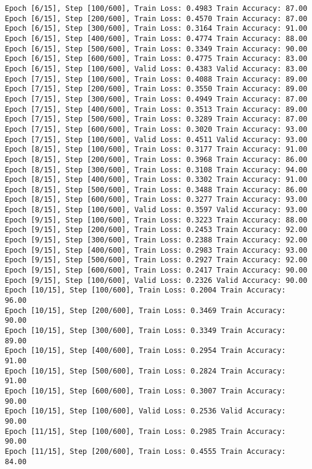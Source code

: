 \documentclass[11pt]{article}
\begin{document}
\begin{Verbatim}[commandchars=\\\{\}]
Epoch [6/15], Step [100/600], Train Loss: 0.4983 Train Accuracy: 87.00
Epoch [6/15], Step [200/600], Train Loss: 0.4570 Train Accuracy: 87.00
Epoch [6/15], Step [300/600], Train Loss: 0.3164 Train Accuracy: 91.00
Epoch [6/15], Step [400/600], Train Loss: 0.4774 Train Accuracy: 88.00
Epoch [6/15], Step [500/600], Train Loss: 0.3349 Train Accuracy: 90.00
Epoch [6/15], Step [600/600], Train Loss: 0.4775 Train Accuracy: 83.00
Epoch [6/15], Step [100/600], Valid Loss: 0.4383 Valid Accuracy: 83.00
Epoch [7/15], Step [100/600], Train Loss: 0.4088 Train Accuracy: 89.00
Epoch [7/15], Step [200/600], Train Loss: 0.3550 Train Accuracy: 89.00
Epoch [7/15], Step [300/600], Train Loss: 0.4949 Train Accuracy: 87.00
Epoch [7/15], Step [400/600], Train Loss: 0.3513 Train Accuracy: 89.00
Epoch [7/15], Step [500/600], Train Loss: 0.3289 Train Accuracy: 87.00
Epoch [7/15], Step [600/600], Train Loss: 0.3020 Train Accuracy: 93.00
Epoch [7/15], Step [100/600], Valid Loss: 0.4511 Valid Accuracy: 93.00
Epoch [8/15], Step [100/600], Train Loss: 0.3177 Train Accuracy: 91.00
Epoch [8/15], Step [200/600], Train Loss: 0.3968 Train Accuracy: 86.00
Epoch [8/15], Step [300/600], Train Loss: 0.3108 Train Accuracy: 94.00
Epoch [8/15], Step [400/600], Train Loss: 0.3302 Train Accuracy: 91.00
Epoch [8/15], Step [500/600], Train Loss: 0.3488 Train Accuracy: 86.00
Epoch [8/15], Step [600/600], Train Loss: 0.3277 Train Accuracy: 93.00
Epoch [8/15], Step [100/600], Valid Loss: 0.3597 Valid Accuracy: 93.00
Epoch [9/15], Step [100/600], Train Loss: 0.3223 Train Accuracy: 88.00
Epoch [9/15], Step [200/600], Train Loss: 0.2453 Train Accuracy: 92.00
Epoch [9/15], Step [300/600], Train Loss: 0.2388 Train Accuracy: 92.00
Epoch [9/15], Step [400/600], Train Loss: 0.2983 Train Accuracy: 93.00
Epoch [9/15], Step [500/600], Train Loss: 0.2927 Train Accuracy: 92.00
Epoch [9/15], Step [600/600], Train Loss: 0.2417 Train Accuracy: 90.00
Epoch [9/15], Step [100/600], Valid Loss: 0.2326 Valid Accuracy: 90.00
Epoch [10/15], Step [100/600], Train Loss: 0.2004 Train Accuracy: 96.00
Epoch [10/15], Step [200/600], Train Loss: 0.3469 Train Accuracy: 90.00
Epoch [10/15], Step [300/600], Train Loss: 0.3349 Train Accuracy: 89.00
Epoch [10/15], Step [400/600], Train Loss: 0.2954 Train Accuracy: 91.00
Epoch [10/15], Step [500/600], Train Loss: 0.2824 Train Accuracy: 91.00
Epoch [10/15], Step [600/600], Train Loss: 0.3007 Train Accuracy: 90.00
Epoch [10/15], Step [100/600], Valid Loss: 0.2536 Valid Accuracy: 90.00
Epoch [11/15], Step [100/600], Train Loss: 0.2985 Train Accuracy: 90.00
Epoch [11/15], Step [200/600], Train Loss: 0.4555 Train Accuracy: 84.00

\end{Verbatim}
\end{document}
